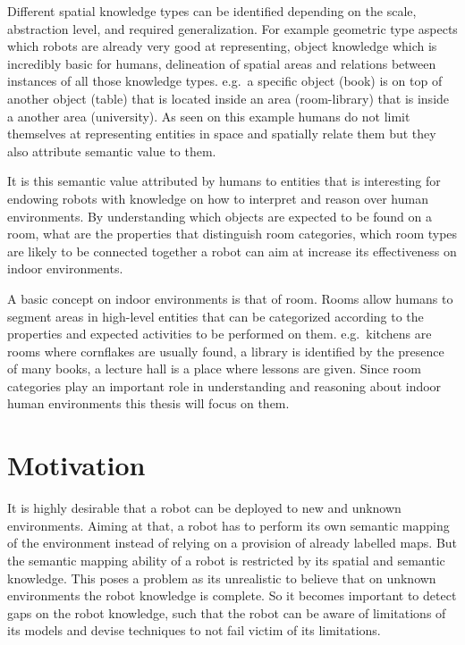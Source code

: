 Different spatial knowledge types can be identified depending on the scale, abstraction level,
and required generalization. For example geometric type aspects which robots are already very
good at representing, object knowledge which is incredibly basic for humans, delineation
of spatial areas and relations between instances of all those knowledge types. e.g.\ a specific
object (book) is on top of another object (table) that is located inside an area (room-library)
that is inside a another area (university).
As seen on this example humans do not limit themselves at representing entities
in space and spatially relate them but they also attribute semantic value to them.

It is this semantic value attributed by humans to entities that is interesting for endowing
robots with knowledge on how to interpret and reason over human environments.
By understanding which objects are expected to be found on a room, what are the properties that
distinguish room categories, which room types are likely to be connected together a robot can
aim at increase its effectiveness on indoor environments.

A basic concept on indoor environments is that of room. Rooms allow humans to segment areas
in high\hyp{}level entities that can be categorized according to the properties and expected
activities to be performed on them.
e.g.\ kitchens are rooms where cornflakes are usually found, a library is identified by the presence
of many books, a lecture hall is a place where lessons are given.
Since room categories play an important role in understanding and reasoning about
indoor human environments this thesis will focus on them.

\section{Motivation}
It is highly desirable that a robot can be deployed to new and unknown environments. Aiming at that,
a robot has to perform its own semantic mapping of the environment instead of relying on a provision
of already labelled maps.
But the semantic mapping ability of a robot is restricted by its spatial and semantic knowledge.
This poses a problem as its unrealistic to believe that on unknown environments the robot knowledge
is complete. So it becomes important to detect gaps on the robot knowledge, such that the robot can
be aware of limitations of its models and devise techniques to not fail victim of its limitations.

